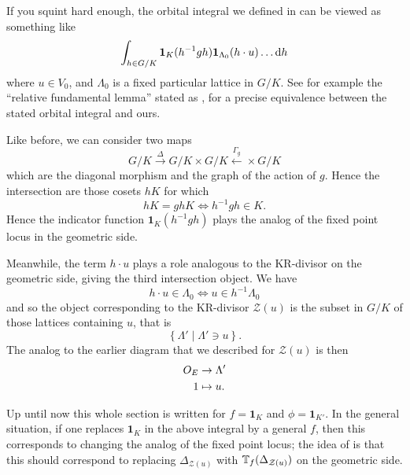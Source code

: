 If you squint hard enough, the orbital integral we defined in 
can be viewed as something like
\[ \int_{h \in G/K} \mathbf{1}_K(h^{-1} g h) \mathbf{1}_{\Lambda_0}(h \cdot u) \dotso \odif h \]
where $u \in V_0$, and $\Lambda_0$ is a fixed particular lattice in $G/K$.
See for example the ``relative fundamental lemma''
stated as \cite[Conjecture 1.9]{ref:liuFJ},
for a precise equivalence between the stated orbital integral and ours.

Like before, we can consider two maps
\[ G/K \xrightarrow{\Delta} G/K \times G/K \xleftarrow{\Gamma_g} \times G/K \]
which are the diagonal morphism and the graph of the action of $g$.
Hence the intersection are those cosets $hK$ for which
\[ hK = ghK \iff h^{-1} g h \in K. \]
Hence the indicator function $\mathbf{1}_K(h^{-1} g h)$
plays the analog of the fixed point locus in the geometric side.

Meanwhile, the term $h \cdot u$ plays a role analogous
to the KR-divisor on the geometric side, giving the third intersection object.
We have
\[ h \cdot u \in \Lambda_0 \iff u \in h^{-1} \Lambda_0 \]
and so the object corresponding to the KR-divisor $\mathcal Z(u)$
is the subset in $G/K$ of those lattices containing $u$, that is
\[ \left\{ \Lambda' \mid \Lambda' \ni u \right\}. \]
The analog to the earlier diagram that we described for $\mathcal Z(u)$ is then
\begin{align*}
  O_E &\to \Lambda' \\
  1 &\mapsto u.
\end{align*}

Up until now this whole section is written for $f = \mathbf{1}_K$ and $\phi = \mathbf{1}_{K'}$.
In the general situation,
if one replaces $\mathbf{1}_K$ in the above integral by a general $f$,
then this corresponds to changing the analog of the fixed point locus;
the idea of \cite{ref:AFLspherical} is that
this should correspond to replacing $\Delta_{\mathcal Z(u)}$
with $\mathbb T_f(\Delta_{\mathcal Z(u)})$ on the geometric side.
